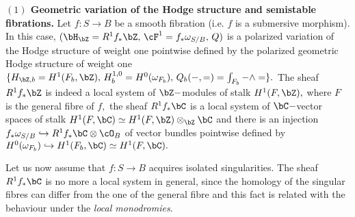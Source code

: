 \documentclass[a4paper,11pt]{amsart}
\begin{document}
{			{\bf $(1)$ Geometric variation of the Hodge structure and semistable fibrations.}\label{ES-LocSyst1}  Let $f:S\to B$ be a smooth fibration (i.e. $f$ is a submersive morphism). In this case, $(\bH_{\bZ}=R^1f_*\bZ,\,  \cF^1=f_*\omega_{S/B},\, Q )$ is a polarized variation of the Hodge structure of weight one pointwise defined by the polarized geometric Hodge structure of weight one $\{H_{\bZ,b}=H^1(F_{b},\bZ),\,H_b^{1,0}=H^0(\omega_{F_{b}}),\,Q_b(-,=)=\int_{F_b}-\wedge =\}.$  The sheaf $R^1f_\ast\bZ $ is indeed a local system of $\bZ-$modules of stalk $H^1(F,\bZ),$ where $F$ is the general fibre of $f,$ the sheaf $R^1f_\ast\bC$ is a local system of $\bC-$vector spaces of stalk $H^1(F,\bC)\simeq H^1(F,\bZ)\otimes_\bZ\bC$ and there is an injection $ f_\ast\omega_{S/B}\hookrightarrow R^1f_\ast\bC \otimes \cO_B$ of vector bundles pointwise defined by $H^0(\omega_{F_b})\hookrightarrow H^1(F_b,\bC)\simeq H^1(F,\bC).$  %
			
			
			Let us now assume that $f:S\to B$ acquires isolated singularities. The sheaf $R^1f_\ast\bC$ is no more a local system in general, since the homology of the singular fibres can differ from the one of the general fibre and this fact is related with the behaviour under the {\em local monodromies}.
			
}
\end{document}
